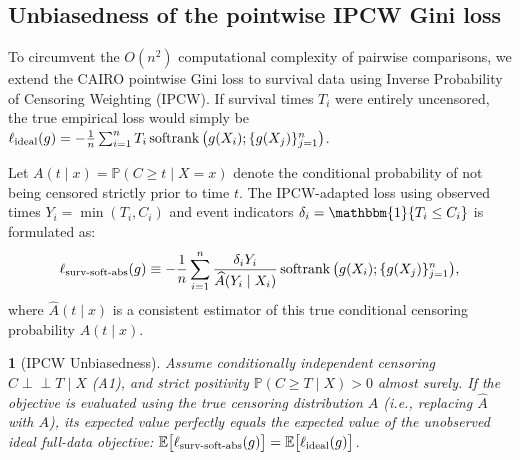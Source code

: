\documentclass[11pt]{article}
\theoremstyle{plain}
\theoremstyle{plain}
\theoremstyle{plain}
\theoremstyle{plain}
\newtheorem{theorem}{\protect\theoremname}
\theoremstyle{plain}
\theoremstyle{plain}
\theoremstyle{plain}
\providecommand{\theoremname}{Theorem}
\begin{document}
\subsection{Unbiasedness of the pointwise IPCW Gini loss}

To circumvent the $O(n^2)$ computational complexity of pairwise comparisons, we extend the \textsc{CAIRO} pointwise Gini loss to survival data using Inverse Probability of Censoring Weighting (IPCW). If survival times $T_i$ were entirely uncensored, the true empirical loss would simply be $\ell_{\textup{ideal}}(g) = -\frac{1}{n}\sum_{i=1}^n T_i \operatorname{softrank}\big(g(X_i); \{g(X_j)\}_{j=1}^n\big)$. 

Let $A(t \mid x) = \mathbb{P}(C \ge t \mid X=x)$ denote the conditional probability of not being censored strictly prior to time $t$. The IPCW-adapted loss using observed times $Y_i = \min(T_i, C_i)$ and event indicators $\delta_i = \mathbbm{1}\{T_i \le C_i\}$ is formulated as:
\begin{equation}
\label{eq:surv_pointwise}
    \ell_{\textup{surv-soft-abs}}(g) \equiv - \frac{1}{n} \sum_{i=1}^n \frac{\delta_i Y_i}{\widehat{A}(Y_i \mid X_i)} \operatorname{softrank}\big(g(X_i);\{g(X_j)\}_{j=1}^{n}\big),
\end{equation}
where $\widehat{A}(t \mid x)$ is a consistent estimator of this true conditional censoring probability $A(t \mid x)$.

\begin{theorem}[IPCW Unbiasedness]
\label{thm:ipcw_unbiasedness}
Assume conditionally independent censoring $C \perp\!\!\!\perp T \mid X$ (A1), and strict positivity $\mathbb{P}(C \ge T \mid X) > 0$ almost surely. If the objective is evaluated using the true censoring distribution $A$ (i.e., replacing $\widehat{A}$ with $A$), its expected value perfectly equals the expected value of the unobserved ideal full-data objective: $\mathbb{E} \big[ \ell_{\textup{surv-soft-abs}}(g) \big] = \mathbb{E} \big[ \ell_{\textup{ideal}}(g) \big]$.
\end{theorem}
\end{document}
